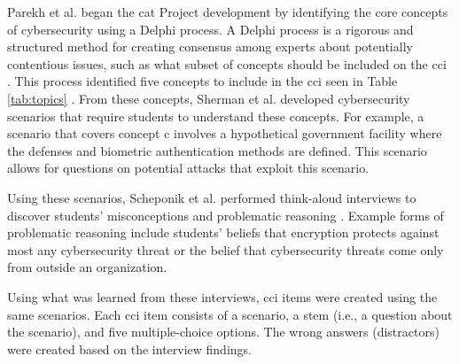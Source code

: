 Parekh et al. \cite{delphi} began the \gls{cat} Project development by identifying the core concepts of cybersecurity using a Delphi process. A Delphi process is a rigorous and structured method for creating consensus among experts about potentially contentious issues, such as what subset of concepts should be included on the \gls{cci} \cite{original_delphi}. This process identified five concepts to include in the \gls{cci} seen in Table \ref{tab:topics} \cite{delphi}. From these concepts, Sherman et al. \cite{scenarios} developed cybersecurity scenarios that require students to understand these concepts. For example, a scenario that covers concept \gls{c} involves a hypothetical government facility where the defenses and biometric authentication methods are defined. This scenario allows for questions on potential attacks that exploit this scenario.

Using these scenarios, Scheponik et al. \cite{misconceptions} performed think-aloud interviews to discover students' misconceptions and problematic reasoning \cite{jcerp}. Example forms of problematic reasoning include students' beliefs that encryption protects against most any cybersecurity threat or the belief that cybersecurity threats come only from outside an organization.

Using what was learned from these interviews, \gls{cci} items were created using the same scenarios. Each \gls{cci} item consists of a scenario, a stem (i.e., a question about the scenario), and five multiple-choice options. The wrong answers (distractors) were created based on the interview findings.